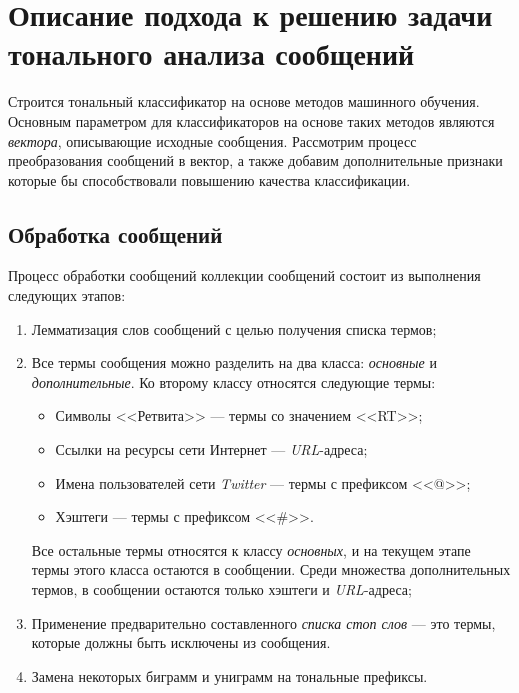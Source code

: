 \section{Описание подхода к решению задачи тонального анализа сообщений}
    \label{sec:buildingApproachDescription}
    Строится тональный классификатор на основе методов машинного обучения.
    Основным параметром для классификаторов на основе таких методов
    являются {\it вектора}, описывающие исходные сообщения.
    Рассмотрим процесс преобразования сообщений в вектор, а также добавим
    дополнительные признаки которые бы способствовали повышению качества
    классификации.

    \subsection{Обработка сообщений}
    \label{sec:buildingMsgProcessing}
    Процесс обработки сообщений коллекции сообщений состоит из выполнения
    следующих этапов:
    \begin{enumerate}
        \item Лемматизация слов сообщений с целью получения списка термов;

        \item Все термы сообщения можно разделить на два класса: {\it основные} и
            {\it дополнительные}.
            Ко второму классу относятся следующие термы:
            \begin{itemize}
                \item Символы <<Ретвита>> --- термы со значением <<RT>>;
                \item Ссылки на ресурсы сети Интернет --- {\it URL\hspace{1pt}}-адреса;
                \item Имена пользователей сети {\it Twitter} --- термы с префиксом <<@>>;
                \item Хэштеги --- термы с префиксом <<\#>>.
            \end{itemize}
            Все остальные термы относятся к классу {\it основных}, и на текущем этапе
            термы этого класса остаются в сообщении. Среди множества дополнительных
            термов, в сообщении остаются только хэштеги и {\it URL\hspace{1pt}}-адреса;

        \item Применение предварительно составленного {\it списка стоп слов} ---
            это термы, которые должны быть исключены из сообщения.
        \item Замена некоторых биграмм и униграмм на тональные префиксы.
    \end{enumerate}

